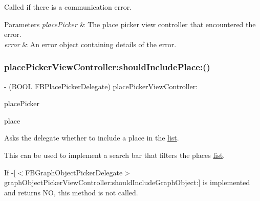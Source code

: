 Called if there is a communication error.


\begin{DoxyParams}{Parameters}
{\em place\+Picker} & The place picker view controller that encountered the error. \\
\hline
{\em error} & An error object containing details of the error. \\
\hline
\end{DoxyParams}
\mbox{\label{protocolFBPlacePickerDelegate_01-p_a619f252e10abcf1c95a99de98181bc41}} 
\subsubsection{\texorpdfstring{place\+Picker\+View\+Controller\+:should\+Include\+Place\+:()}{placePickerViewController:shouldIncludePlace:()}\hspace{0.1cm}{\footnotesize\ttfamily [1/5]}}
{\footnotesize\ttfamily -\/ (B\+O\+OL F\+B\+Place\+Picker\+Delegate) place\+Picker\+View\+Controller\+: \begin{DoxyParamCaption}\item[{(\hyperlink{interfaceFBPlacePickerViewController}{F\+B\+Place\+Picker\+View\+Controller} $\ast$)}]{place\+Picker }\item[{shouldIncludePlace:(id$<$ \hyperlink{protocolFBGraphPlace-p}{F\+B\+Graph\+Place} $>$)}]{place }\end{DoxyParamCaption}\hspace{0.3cm}{\ttfamily [optional]}}

Asks the delegate whether to include a place in the \hyperlink{protocollist-p}{list}.

This can be used to implement a search bar that filters the places \hyperlink{protocollist-p}{list}.

If -\/\mbox{[}$<$\+F\+B\+Graph\+Object\+Picker\+Delegate$>$ graph\+Object\+Picker\+View\+Controller\+:should\+Include\+Graph\+Object\+:\mbox{]} is implemented and returns NO, this method is not called.


